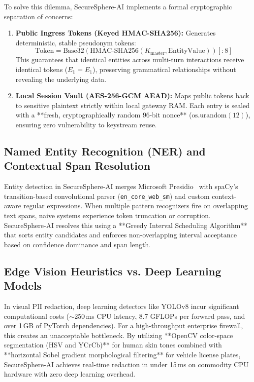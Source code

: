\documentclass[12pt,a4paper,oneside]{report}
\numberwithin{equation}{chapter}
\begin{document}
To solve this dilemma, SecureSphere-AI implements a formal cryptographic separation of concerns:
\begin{enumerate}[leftmargin=*]
    \item \textbf{Public Ingress Tokens (Keyed HMAC-SHA256):} Generates deterministic, stable pseudonym tokens:
    \begin{equation}
    \text{Token} = \text{Base32}(\text{HMAC-SHA256}(K_{\text{master}}, \text{EntityValue}))[:8]
    \end{equation}
    This guarantees that identical entities across multi-turn interactions receive identical tokens ($E_1 = E_1$), preserving grammatical relationships without revealing the underlying data.
    \item \textbf{Local Session Vault (AES-256-GCM AEAD):} Maps public tokens back to sensitive plaintext strictly within local gateway RAM. Each entry is sealed with a **fresh, cryptographically random 96-bit nonce** ($\text{os.urandom}(12)$), ensuring zero vulnerability to keystream reuse.
\end{enumerate}

\subsection{Named Entity Recognition (NER) and Contextual Span Resolution}
Entity detection in SecureSphere-AI merges Microsoft Presidio~\cite{presidio2021} with spaCy's transition-based convolutional parser (\texttt{en\_core\_web\_sm}) and custom context-aware regular expressions. When multiple pattern recognizers fire on overlapping text spans, naive systems experience token truncation or corruption. SecureSphere-AI resolves this using a **Greedy Interval Scheduling Algorithm** that sorts entity candidates and enforces non-overlapping interval acceptance based on confidence dominance and span length.

\subsection{Edge Vision Heuristics vs. Deep Learning Models}
In visual PII redaction, deep learning detectors like YOLOv8 incur significant computational costs ($\sim$250\,ms CPU latency, 8.7 GFLOPs per forward pass, and over 1\,GB of PyTorch dependencies). For a high-throughput enterprise firewall, this creates an unacceptable bottleneck. By utilizing **OpenCV color-space segmentation (HSV and YCrCb)** for human skin tones combined with **horizontal Sobel gradient morphological filtering** for vehicle license plates, SecureSphere-AI achieves real-time redaction in under 15\,ms on commodity CPU hardware with zero deep learning overhead.
\end{document}
